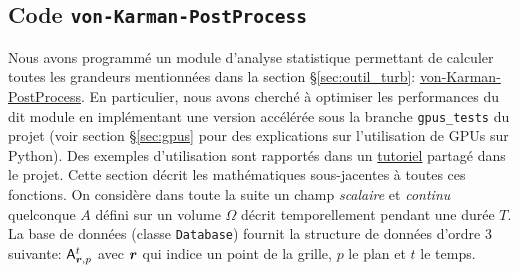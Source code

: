 \documentclass[13pt, a4paper]{extarticle}
\begin{document}
\subsection{Code \texttt{von-Karman-PostProcess}}\label{sec:code-VK}
\noindent Nous avons programmé un module d'analyse statistique permettant de calculer toutes
les grandeurs mentionnées dans la section \S\ref{sec:outil_turb}:
\href{https://gitlab.lisn.upsaclay.fr/allaglo/von-karman-postprocess/-/tree/gpus_tests?ref_type=heads}
{von-Karman-PostProcess}. En particulier, nous avons cherché à optimiser les performances
du dit module en implémentant une version accélérée sous la branche \texttt{gpus\_tests}
du projet (voir section \S \ref{sec:gpus} pour des explications sur l'utilisation de 
GPUs sur Python). Des exemples d'utilisation sont rapportés
dans un \href{https://gitlab.lisn.upsaclay.fr/allaglo/von-karman-postprocess/-/blob/main/tutorials/tutorial.ipynb}{tutoriel}
partagé dans le projet. Cette section décrit les mathématiques sous-jacentes à
toutes ces fonctions. On considère dans toute la suite un champ \emph{scalaire} et 
\emph{continu} quelconque $A$ défini sur un volume $\Omega$ décrit temporellement pendant une durée $T$.
La base de données (classe \texttt{Database}) fournit la structure de données
d'ordre 3 suivante:
$\mathsf{A}_{\boldsymbol{r},p}^t$ avec $\boldsymbol{r}$ qui indice un point de la grille, $p$ le plan
et $t$ le temps.
\end{document}
